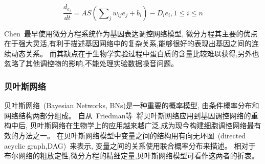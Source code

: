 \begin{equation}
\frac{{d_{e_i } }}{{dt}} = AS(\sum\nolimits_j {w_{ij} e_j } + b_i) - D_i e_i ,1 \le i \le n
\end{equation}

Chen~\cite{chen1999modeling}最早使用微分方程系统作为基因表达调控网络模型,
微分方程其主要的优点在于强大灵活,有利于描述基因网络中的复杂关系,能够很好的表现出基因之间的连续动态关系。
而其缺点在于生物学实验过程中蛋白质的含量比较难以获得,另外也忽略了其他调控物的影响,不能处理实验数据噪音问题。

\subsubsection{贝叶斯网络}
贝叶斯网络~(Bayesian Networks, BNs)是一种重要的概率模型,
由条件概率分布和网络结构两部分组成。
自从~Friedman等~\cite{friedman2000using}将贝叶斯网络应用到基因调控网络的重构中后,
贝叶斯网络在生物学上的应用越来越广泛,成为现今构建细胞调控网络最有效的方法之一。
在贝叶斯网络模型中变量之间的结构用有向无环图~(directed acyclic graph,DAG)~来表示,
变量之间的关系使用联合概率分布来描述。
相对于布尔网络的粗放定性,微分方程的精细定量,贝叶斯网络模型可看作这两者的折衷。

